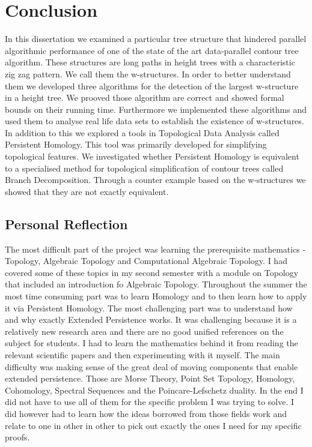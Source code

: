 \chapter{Conclusion}
\label{chapter8}

In this dissertation we examined a particular tree structure that hindered parallel algorithmic performance of one of the state of the art data-parallel contour tree algorithm. These structures are long paths in height trees with a characteristic zig zag pattern. We call them the w-structures. In order to better understand them we developed three algorithms for the detection of the largest w-structure in a height tree. We prooved those algorithm are correct and showed formal bounds on their running time. Furthermore we implemented these algorithms and used them to analyse real life data sets to establish the existence of w-structures. In addition to this we explored a tools in Topological Data Analysis called Persistent Homology. This tool was primarily developed for simplifying topological features. We investigated whether Persistent Homology is equivalent to a specialised method for topological simplification of contour trees called Branch Decomposition. Through a counter example based on the w-structures we showed that they are not exactly equivalent.


\section{Personal Reflection}

The most difficult part of the project was learning the prerequisite mathematics - Topology, Algebraic Topology and Computational Algebraic Topology. I had covered some of these topics in my second semester with a module on Topology that included an introduction fo Algebraic Topology. Throughout the summer the most time consuming part was to learn Homology and to then learn how to apply it via Persistent Homology. The most challenging part was to understand how and why exactly Extended Persistence works. It was challenging because it is a relatively new research area and there are no good unified references on the subject for students. I had to learn the mathematics behind it from reading the relevant scientific papers and then experimenting with it myself. The main difficulty was making sense of the great deal of moving components that enable extended persistence. Those are Morse Theory, Point Set Topology, Homology, Cohomology, Spectral Sequences and the Poincare-Lefschetz duality. In the end I did not have to use all of them for the specific problem I was trying to solve. I did however had to learn how the ideas borrowed from those fields work and relate to one in other in other to pick out exactly the ones I need for my specific proofs.

